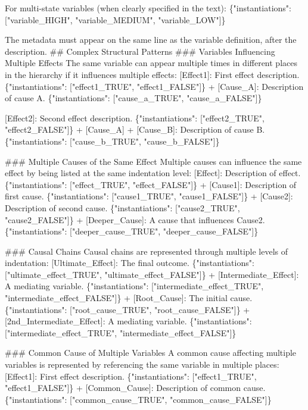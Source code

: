 \documentclass[
  11pt,
  letterpaper,
]{book}
\newenvironment{Shaded}{\begin{snugshade}}{\end{snugshade}}
\newcommand{\StringTok}[1]{\textcolor[rgb]{0.13,0.47,0.30}{#1}}
\begin{document}
\begin{landscape}
\begin{Shaded}
\begin{Highlighting}[]
\StringTok{For multi{-}state variables (when clearly specified in the text):}
\StringTok{\{"instantiations": ["variable\_HIGH", "variable\_MEDIUM", "variable\_LOW"]\}}

\StringTok{The metadata must appear on the same line as the variable definition, after the description.}
\StringTok{\#\# Complex Structural Patterns}
\StringTok{\#\#\# Variables Influencing Multiple Effects}
\StringTok{The same variable can appear multiple times in different places in the hierarchy if it influences multiple effects:}
\StringTok{[Effect1]: First effect description. \{"instantiations": ["effect1\_TRUE", "effect1\_FALSE"]\}}
\StringTok{  + [Cause\_A]: Description of cause A. \{"instantiations": ["cause\_a\_TRUE", "cause\_a\_FALSE"]\}}

\StringTok{[Effect2]: Second effect description. \{"instantiations": ["effect2\_TRUE", "effect2\_FALSE"]\}}
\StringTok{  + [Cause\_A]}
\StringTok{  + [Cause\_B]: Description of cause B. \{"instantiations": ["cause\_b\_TRUE", "cause\_b\_FALSE"]\}}

\StringTok{\#\#\# Multiple Causes of the Same Effect}
\StringTok{Multiple causes can influence the same effect by being listed at the same indentation level:}
\StringTok{[Effect]: Description of effect. \{"instantiations": ["effect\_TRUE", "effect\_FALSE"]\}}
\StringTok{  + [Cause1]: Description of first cause. \{"instantiations": ["cause1\_TRUE", "cause1\_FALSE"]\}}
\StringTok{  + [Cause2]: Description of second cause. \{"instantiations": ["cause2\_TRUE", "cause2\_FALSE"]\}}
\StringTok{    + [Deeper\_Cause]: A cause that influences Cause2. \{"instantiations": ["deeper\_cause\_TRUE", "deeper\_cause\_FALSE"]\}}

\StringTok{\#\#\# Causal Chains}
\StringTok{Causal chains are represented through multiple levels of indentation:}
\StringTok{[Ultimate\_Effect]: The final outcome. \{"instantiations": ["ultimate\_effect\_TRUE", "ultimate\_effect\_FALSE"]\}}
\StringTok{  + [Intermediate\_Effect]: A mediating variable. \{"instantiations": ["intermediate\_effect\_TRUE", "intermediate\_effect\_FALSE"]\}}
\StringTok{    + [Root\_Cause]: The initial cause. \{"instantiations": ["root\_cause\_TRUE", "root\_cause\_FALSE"]\}}
\StringTok{  + [2nd\_Intermediate\_Effect]: A mediating variable. \{"instantiations": ["intermediate\_effect\_TRUE", "intermediate\_effect\_FALSE"]\}}


\StringTok{\#\#\# Common Cause of Multiple Variables}
\StringTok{A common cause affecting multiple variables is represented by referencing the same variable in multiple places:}
\StringTok{[Effect1]: First effect description. \{"instantiations": ["effect1\_TRUE", "effect1\_FALSE"]\}}
\StringTok{  + [Common\_Cause]: Description of common cause. \{"instantiations": ["common\_cause\_TRUE", "common\_cause\_FALSE"]\}}


\end{Highlighting}
\end{Shaded}
\end{landscape}
\end{document}

